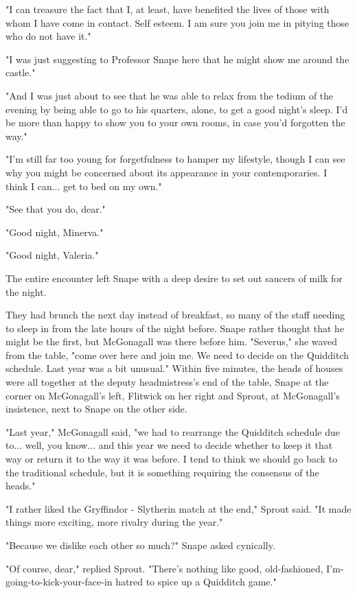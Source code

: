 \documentclass[a4paper,11pt]{article}
\begin{document}
"I can treasure the fact that I, at least, have benefited the lives of those with whom I have come in contact. Self esteem. I am sure you join me in pitying those who do not have it."

"I was just suggesting to Professor Snape here that he might show me around the castle."

"And I was just about to see that he was able to relax from the tedium of the evening by being able to go to his quarters, alone, to get a good night's sleep. I'd be more than happy to show you to your own rooms, in case you'd forgotten the way."

"I'm still far too young for forgetfulness to hamper my lifestyle, though I can see why you might be concerned about its appearance in your contemporaries. I think I can... get to bed on my own."

"See that you do, dear."

"Good night, Minerva."

"Good night, Valeria."

The entire encounter left Snape with a deep desire to set out saucers of milk for the night.

They had brunch the next day instead of breakfast, so many of the staff needing to sleep in from the late hours of the night before. Snape rather thought that he might be the first, but McGonagall was there before him. "Severus," she waved from the table, "come over here and join me. We need to decide on the Quidditch schedule. Last year was a bit unusual." Within five minutes, the heads of houses were all together at the deputy headmistress's end of the table, Snape at the corner on McGonagall's left, Flitwick on her right and Sprout, at McGonagall's insistence, next to Snape on the other side.

"Last year," McGonagall said, "we had to rearrange the Quidditch schedule due to... well, you know... and this year we need to decide whether to keep it that way or return it to the way it was before. I tend to think we should go back to the traditional schedule, but it is something requiring the consensus of the heads."

"I rather liked the Gryffindor - Slytherin match at the end," Sprout said. "It made things more exciting, more rivalry during the year."

"Because we dislike each other so much?" Snape asked cynically.

"Of course, dear," replied Sprout. "There's nothing like good, old-fashioned, I'm-going-to-kick-your-face-in hatred to spice up a Quidditch game."
\end{document}
